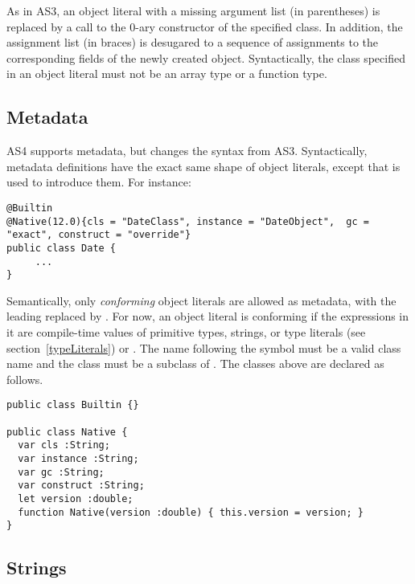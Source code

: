   As in AS3, an object literal with a
missing argument list (in parentheses) is replaced by a call to the 0-ary
constructor of the specified class. In addition, the assignment list (in braces) is desugared
to a sequence of assignments to the corresponding fields of the newly
created object. Syntactically, the class specified in an object
literal must not be an array type or a function type.

\subsection{Metadata}
\label{metadata}
AS4 supports metadata, but changes the syntax from AS3. Syntactically, metadata
definitions have the exact same shape of object literals, except that
 is used to introduce them. For instance:
\begin{verbatim}
@Builtin
@Native(12.0){cls = "DateClass", instance = "DateObject",  gc = "exact", construct = "override"}
public class Date {
     ...
}
\end{verbatim}
Semantically, only {\em conforming} object literals are
allowed as metadata, with the leading  replaced
by . For now, an object literal is conforming if the
expressions in it are compile-time values of primitive types, strings, or type literals (see
section~\ref{typeLiterals}) or .
The name following the  symbol must be a valid class name and the class
must be a subclass of .
The classes above are declared as follows.
\begin{verbatim}
public class Builtin {}

public class Native {
  var cls :String;
  var instance :String;
  var gc :String;
  var construct :String;
  let version :double;
  function Native(version :double) { this.version = version; }
}
\end{verbatim}

\subsection{Strings}
\label{sec:string}

